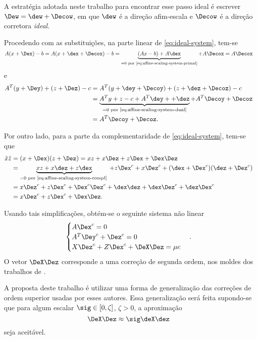 A estratégia adotada neste trabalho para encontrar esse passo ideal é  escrever
$\Dew = \dew + \Decow$, em que  $\dew$ é a direção afim-escala e $\Decow$ é a direção corretora 
\emph{ideal}.

Procedendo com as substituições, na parte linear de \eqref{eq:ideal-system},
tem-se
\[ A(x+\Dex) - b = A(x+\dex + \Decox) - b = \underbrace{(Ax - b) + A\dex}_{=0
\text{ por \eqref{eq:affine-scaling-system-primal}}} + A\Decox = A\Decox \] 
e
\begin{align*}
A^T(y+\Dey) + (z+\Dez) - c &= A^T(y+\dey+\Decoy) + (z+\dez+\Decoz) - c \\
						  &= \underbrace{A^Ty + z - c + A^T\dey+ +\dez}_{=0 
						  \text{ por \eqref{eq:affine-scaling-system-dual}}} +
						   A^T\Decoy +\Decoz \\
						  &=  A^T\Decoy +\Decoz.
\end{align*} 

Por outro lado, para a parte da complementaridade de 
\eqref{eq:ideal-system}, tem-se que
\begin{align*}
\hat{x}\hat{z} &= (x + \Dex)(z+\Dez) = xz + x\Dez + z\Dex + \Dex\Dez \\
                &= \underbrace{xz + x\dez + z\dex}_{=0 \text{ por
                \eqref{eq:affine-scaling-system-compl} }}  + z\Dex^c + x\Dez^c + (\dex + \Dex^c)(\dez + \Dez^c) \\
                &=  x\Dez^c  +z\Dex^c + \Dex^c\Dez^c + \dex\dez 
                + \dex\Dez^c + \dez\Dex^c \\
                &=         x\Dez^c  +z\Dex^c + \Dex\Dez.     
\end{align*}
  
Usando tais simplificações, obtém-se o seguinte sistema não linear
\begin{equation}\begin{cases}
A\Dex^c =  0\\
A^T\Dey^c +\Dez^c =  0\\
X\Dez^c + Z\Dex^c + \DeX\Dez = \mu e 
\label{eq:corrector-nonlinear}
\end{cases}.
\end{equation}
O vetor $\DeX\Dez$ corresponde a uma correção de segunda ordem, nos moldes dos
trabalhos de \citet{Mehrotra:1992wr,Gondzio:1996uw}.



A proposta deste trabalho é utilizar uma  forma de generalização das correções
de ordem superior usadas por esses autores.
Essa generalização será feita supondo-se que para algum escalar
$\sig\in[0,\zeta]$, $\zeta>0$, a aproximação
\begin{equation}
\label{eq:aproximacao-direcao}
\DeX\Dez \approx \sig \deX\dez
\end{equation} 
seja aceitável.

